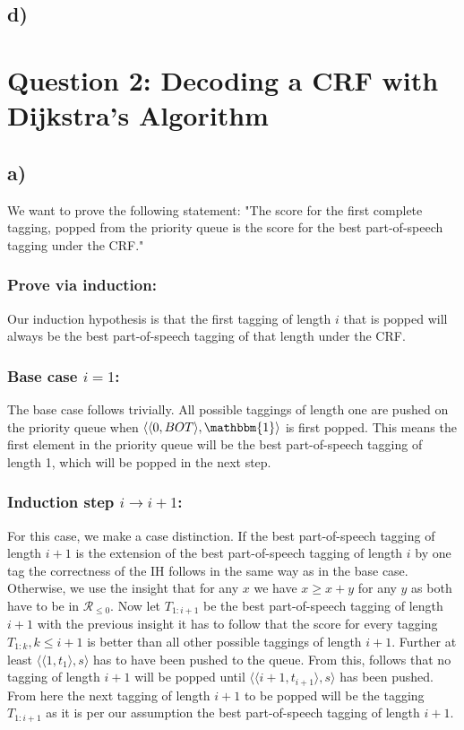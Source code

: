 \documentclass[a4paper,12pt]{ETHexercise}
\begin{document}
\subsection*{d)}

\section*{Question 2: Decoding a CRF with Dijkstra's Algorithm}
\subsection*{a)}
We want to prove the following statement: "The score for the first complete tagging, popped from the priority queue is the score for the best part-of-speech tagging under the CRF."

\subsubsection*{Prove via induction:}

Our induction hypothesis is that the first tagging of length $i$ that is popped will always be the best part-of-speech tagging of that length under the CRF.

\subsubsection*{Base case $i=1$:}

The base case follows trivially. All possible taggings of length one are pushed on the priority queue when $\langle \langle 0, BOT \rangle, \mathbbm{1} \rangle$ is first popped. This means the first element in the priority queue will be the best part-of-speech tagging of length 1, which will be popped in the next step.

\subsubsection*{Induction step $i \rightarrow i+1$:}

For this case, we make a case distinction. If the best part-of-speech tagging of length $i+1$ is the extension of the best part-of-speech tagging of length $i$ by one tag the correctness of the IH follows in the same way as in the base case.
Otherwise, we use the insight that for any $x$ we have $x \geq x+y$ for any $y$ as both have to be in $\mathcal{R}_{\leq 0}$.
Now let $T_{1:i+1}$ be the best part-of-speech tagging of length $i+1$ with the previous insight it has to follow that the score for every tagging $T_{1:k}, k \leq i+1$ is better than all other possible taggings of length $i+1$. Further at least $\langle \langle 1, t_1 \rangle, s \rangle$ has to have been pushed to the queue. From this, follows that no tagging of length $i+1$ will be popped until $\langle \langle i+1, t_{i+1} \rangle, s \rangle$ has been pushed. From here the next tagging of length $i+1$ to be popped will be the tagging $T_{1:i+1}$ as it is per our assumption the best part-of-speech tagging of length $i+1$.
\end{document}

